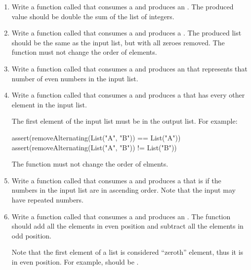 \documentclass[9pt]{extbook}
\begin{document}
\begin{enumerate}

  \item Write a function called  that consumes a
   and produces an . The produced
  value should be double the sum of the list of integers.

  \item Write a function called  that consumes a
   and produces a .
  The produced list should be the same as the input list, but with all zeroes
  removed. The function must not change the order of elements.

  \item Write a function called  that consumes a
   and produces an  that represents
  that number of even numbers in the input list.

  \item Write a function called  that consumes a
   and produces a  that
  has every other element in the input list.

  The first element of the input list must be in the output list.
  For example:
  \begin{scalacode}
  assert(removeAlternating(List("A", "B")) == List("A"))
  assert(removeAlternating(List("A", "B")) != List("B"))
  \end{scalacode}

  The function must not change the order of elments.

  \item Write a function called  that consumes a
   and produces a  that is
   if the numbers in the input list are in ascending order.
  Note that the input may have repeated numbers.

  \item Write a function called  that consumes a
   and produces an . The
  function should add all the elements in even position and subtract all the
  elements in odd position.

  Note that the first element of a list is considered
  ``zeroth'' element, thus it is in even position.
  For example,  should be
  .


\end{enumerate}
\end{document}
